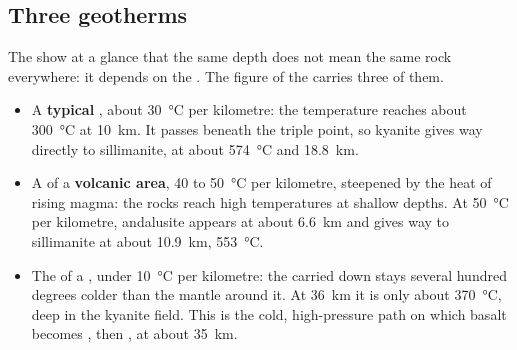 \subsection{Three geotherms}

The  show at a glance that the same depth does not mean the same
rock everywhere: it depends on the . The figure of the 
carries three of them.

\begin{itemize}
  \item A \textbf{typical} , about \qty{30}{\celsius} per
        kilometre: the temperature reaches about \qty{300}{\celsius} at
        \qty{10}{km}. It passes beneath the triple point, so kyanite gives
        way directly to sillimanite, at about \qty{574}{\celsius} and
        \qty{18.8}{km}.
  \item A  of a \textbf{volcanic area}, 40 to \qty{50}{\celsius} per
        kilometre, steepened by the heat of rising magma: the rocks reach
        high temperatures at shallow depths. At \qty{50}{\celsius} per
        kilometre, andalusite appears at about \qty{6.6}{km} and gives way to
        sillimanite at about \qty{10.9}{km}, \qty{553}{\celsius}.
  \item The  of a \textbf{}, under
        \qty{10}{\celsius} per kilometre: the  carried down
        stays several hundred degrees colder than the mantle around it. At
        \qty{36}{km} it is only about \qty{370}{\celsius}, deep in the
        kyanite field. This is the cold, high-pressure path on which basalt
        becomes , then , at about \qty{35}{km}.
\end{itemize}

